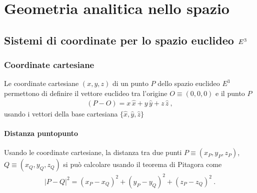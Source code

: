 \documentclass[letterpaper,10pt,italian]{jupyterBook}
\begin{document}
\sphinxstepscope


\chapter{Geometria analitica nello spazio}
\label{\detokenize{ch/analytic_geometry/analytic_geometry_3d:geometria-analitica-nello-spazio}}\label{\detokenize{ch/analytic_geometry/analytic_geometry_3d:geometry-analytic-3d}}\label{\detokenize{ch/analytic_geometry/analytic_geometry_3d::doc}}
\sphinxstepscope


\section{Sistemi di coordinate per lo spazio euclideo \protect\(E^3\protect\)}
\label{\detokenize{ch/analytic_geometry/analytic_geometry_3d/points:sistemi-di-coordinate-per-lo-spazio-euclideo-e-3}}\label{\detokenize{ch/analytic_geometry/analytic_geometry_3d/points:geometry-analytic-3d-coordinates}}\label{\detokenize{ch/analytic_geometry/analytic_geometry_3d/points::doc}}

\subsection{Coordinate cartesiane}
\label{\detokenize{ch/analytic_geometry/analytic_geometry_3d/points:coordinate-cartesiane}}\label{\detokenize{ch/analytic_geometry/analytic_geometry_3d/points:geometry-analytic-3d-coordinates-cartesian}}
\sphinxAtStartPar
Le coordinate cartesiane \((x,y,z)\) di un punto \(P\) dello spazio euclideo \(E^3\) permettono di definire il vettore euclideo tra l’origine \(O \equiv (0,0,0)\) e il punto \(P\)
\begin{equation*}
\begin{split}(P-O) = x \, \hat{x} + y \, \hat{y} + z \, \hat{z} \ ,\end{split}
\end{equation*}
\sphinxAtStartPar
usando i vettori della base cartesiana \(\{ \hat{x}, \hat{y}, \hat{z} \}\)


\subsubsection{Distanza punto\sphinxhyphen{}punto}
\label{\detokenize{ch/analytic_geometry/analytic_geometry_3d/points:distanza-punto-punto}}
\sphinxAtStartPar
Usando le coordinate cartesiane, la distanza tra due punti \(P \equiv(x_P, y_P, z_P)\), \(Q \equiv (x_Q, y_Q, z_Q)\) si può calcolare usando il teorema di Pitagora come
\begin{equation*}
\begin{split}|P-Q|^2 = (x_P - x_Q)^2 + (y_P - y_Q)^2 + (z_P - z_Q)^2 \ .\end{split}
\end{equation*}
\end{document}

